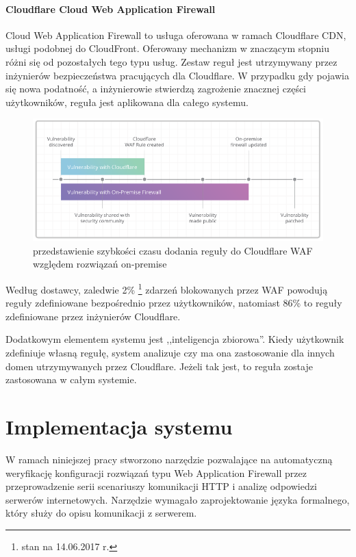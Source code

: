 \documentclass[11pt,a4paper,polish,thesis,oneside]{dcsbook}
\begin{document}
\subsubsection{Cloudflare Cloud Web Application Firewall}
Cloud Web Application Firewall to usługa oferowana w ramach Cloudflare CDN, usługi podobnej do CloudFront. Oferowany mechanizm w znaczącym stopniu różni się od pozostałych tego typu usług. Zestaw reguł jest utrzymywany przez inżynierów bezpieczeństwa pracujących dla Cloudflare. W przypadku gdy pojawia się nowa podatność, a inżynierowie stwierdzą zagrożenie znacznej części użytkowników, reguła jest aplikowana dla całego systemu.

\begin{figure}[h]
\centering
\includegraphics[scale=0.7]{cloudflare}

\caption{przedstawienie szybkości czasu dodania reguły do Cloudflare WAF względem rozwiązań on-premise \cite{cloudflarewaf}}
\label{fig:cloudflare}
\end{figure}

Według dostawcy, zaledwie 2\% \footnote{stan na 14.06.2017 r.} zdarzeń blokowanych przez WAF powodują reguły zdefiniowane bezpośrednio przez użytkowników, natomiast 86\% to reguły zdefiniowane przez inżynierów Cloudflare.

Dodatkowym elementem systemu jest ,,inteligencja zbiorowa''. Kiedy użytkownik zdefiniuje własną regułę, system analizuje czy ma ona zastosowanie dla innych domen utrzymywanych przez Cloudflare. Jeżeli tak jest, to reguła zostaje zastosowana w całym systemie.



\chapter{Implementacja systemu}
W ramach niniejszej pracy stworzono narzędzie pozwalające na automatyczną weryfikację konfiguracji rozwiązań typu Web Application Firewall przez przeprowadzenie serii scenariuszy komunikacji HTTP i analizę odpowiedzi serwerów internetowych. Narzędzie wymagało zaprojektowanie języka formalnego, który służy do opisu komunikacji z serwerem. 
\end{document}
